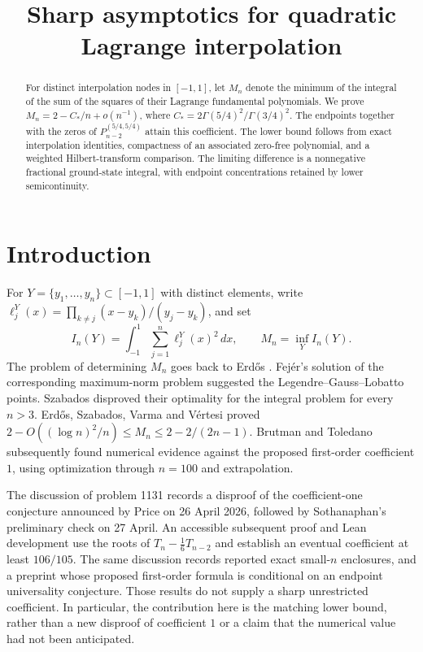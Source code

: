 \documentclass[a4paper,11pt]{amsart}
\title{Sharp asymptotics for quadratic Lagrange interpolation}
\date{}
\theoremstyle{remark}\newtheorem{remark}[theorem]{Remark}
\newcommand{\dd}{\,d}
\begin{document}
\begin{abstract}
For distinct interpolation nodes in $[-1,1]$, let $M_n$ denote the minimum of the integral of the sum of the squares of their Lagrange fundamental polynomials.
We prove $M_n=2-C_*/n+o(n^{-1})$, where $C_*=2\Gamma(5/4)^2/\Gamma(3/4)^2$.
The endpoints together with the zeros of $P_{n-2}^{(5/4,5/4)}$ attain this coefficient.
The lower bound follows from exact interpolation identities, compactness of an associated zero-free polynomial, and a weighted Hilbert-transform comparison.
The limiting difference is a nonnegative fractional ground-state integral, with endpoint concentrations retained by lower semicontinuity.
\end{abstract}
\maketitle

\section{Introduction}

For $Y=\{y_1,\ldots,y_n\}\subset[-1,1]$ with distinct elements, write
$\ell_j^Y(x)=\prod_{k\ne j}(x-y_k)/(y_j-y_k)$, and set
\begin{equation}\label{minimum}
 I_n(Y)=\int_{-1}^1\sum_{j=1}^n\ell_j^Y(x)^2\dd x,
 \qquad M_n=\inf_Y I_n(Y).
\end{equation}
The problem of determining $M_n$ goes back to Erd\H{o}s
\cite{erdos}. Fej\'er's solution of the corresponding maximum-norm
problem suggested the Legendre--Gauss--Lobatto points. Szabados
\cite{szabados} disproved their optimality for the integral problem
for every $n>3$. Erd\H{o}s, Szabados, Varma and V\'ertesi
\cite{esvv} proved $2-O((\log n)^2/n)\le M_n\le2-2/(2n-1)$.
Brutman and Toledano \cite{bt} subsequently found numerical evidence
against the proposed first-order coefficient $1$, using optimization
through $n=100$ and extrapolation.

The discussion of problem 1131 \cite{bloom} records a disproof of the
coefficient-one conjecture announced by Price on 26 April 2026, followed
by Sothanaphan's preliminary check on 27 April. An accessible subsequent
proof and Lean development \cite{lean} use the roots of
$T_n-\frac16T_{n-2}$ and establish an eventual coefficient at least
$106/105$. The same discussion records reported exact small-$n$
enclosures, and a preprint \cite{rafik} whose proposed first-order
formula is conditional on an endpoint universality conjecture. Those
results do not supply a sharp unrestricted coefficient. In particular,
the contribution here is the matching lower bound, rather than a new
disproof of coefficient $1$ or a claim that the numerical value had not
been anticipated.
\end{document}
